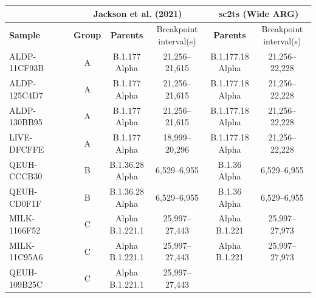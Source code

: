 \documentclass{article}
\begin{document}
\begin{table} \centering
\begin{tabular}{l|c|c|c|c|c} \hline
\multicolumn{1}{c}{} & \multicolumn{3}{c}{\textbf{Jackson et al. (2021)}} &
\multicolumn{2}{c}{\textbf{sc2ts (Wide ARG)}} \\ \hline
\textbf{Sample} &
\textbf{Group} & \textbf{Parents} & \thead{Breakpoint \\
interval(s)} &
\textbf{Parents} & \thead{Breakpoint \\ interval(s)} \\
\hline ALDP-11CF93B & A &
    \thead{B.1.177 \\ Alpha} & 21,256--21,615 &
    \thead{B.1.177.18 \\ Alpha} & 21,256--22,228 \\
ALDP-125C4D7 & A &
    \thead{B.1.177 \\ Alpha} & 21,256--21,615 &
    \thead{B.1.177.18 \\ Alpha} & 21,256--22,228 \\
ALDP-130BB95 & A &
    \thead{B.1.177 \\ Alpha} & 21,256--21,615 &
    \thead{B.1.177.18 \\ Alpha} & 21,256--22,228 \\
LIVE-DFCFFE & A &
    \thead{B.1.177 \\ Alpha} & 18,999--20,296 &
    \thead{B.1.177.18 \\ Alpha} & 21,256--22,228 \\
QEUH-CCCB30 & B &
    \thead{B.1.36.28 \\ Alpha} & 6,529--6,955 &
    \thead{B.1.36 \\ Alpha} & 6,529--6,955 \\
QEUH-CD0F1F & B &
    \thead{B.1.36.28 \\ Alpha} & 6,529--6,955 &
    \thead{B.1.36 \\ Alpha} & 6,529--6,955 \\
MILK-1166F52 & C &
    \thead{Alpha \\ B.1.221.1} & 25,997--27,443 &
    \thead{Alpha \\ B.1.221} & 25,997--27,973 \\
MILK-11C95A6 & C &
    \thead{Alpha \\ B.1.221.1} & 25,997--27,443 &
    \thead{Alpha \\ B.1.221} & 25,997--27,973 \\
QEUH-109B25C & C &
    \thead{Alpha \\ B.1.221.1} & 25,997--27,443 &

\end{tabular}
\end{table}
\end{document}
